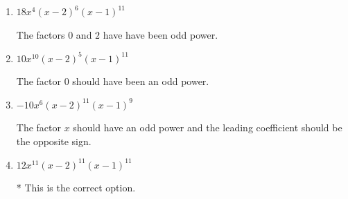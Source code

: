 \documentclass{extbook}[14pt]
\begin{document}
\begin{enumerate}
{\begin{enumerate}[label=\Alph*.]
This corresponds to the leading coefficient being the opposite value than it should be.
\item \( 18x^{4} (x - 2)^{6} (x - 1)^{11} \)

The factors $0$ and $2$ have have been odd power.
\item \( 10x^{10} (x - 2)^{5} (x - 1)^{11} \)

The factor $0$ should have been an odd power.
\item \( -10x^{6} (x - 2)^{11} (x - 1)^{9} \)

The factor $x$ should have an odd power and the leading coefficient should be the opposite sign.
\item \( 12x^{11} (x - 2)^{11} (x - 1)^{11} \)

* This is the correct option.
\end{enumerate}

}
\end{enumerate}
\end{document}
